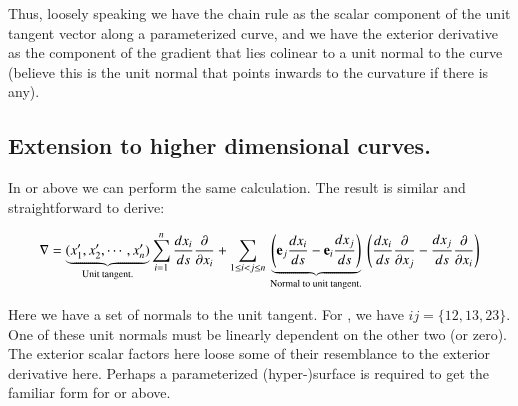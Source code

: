 \documentclass{article}      %
\newcommand{\grad}[0]{\nabla}
\begin{document}
Thus, loosely speaking we have the chain rule as the scalar component of the unit tangent vector along a parameterized curve,
and we have the exterior derivative as the component of the gradient that lies colinear to a unit normal to the curve (believe this
is the unit normal that points inwards to the curvature if there is any).

\subsection{ Extension to higher dimensional curves. }

In  or above we can perform the same calculation.  The result is similar and straightforward to derive:

\begin{equation}
\grad
=
\underbrace{
(x_1', x_2', \cdots, x_n')
 }_{\text{Unit tangent.} }
\sum_{i=1}^n \frac{dx_i}{ds}\frac{\partial}{\partial x_i}
+ \sum_{1 \le i < j \le n} 
\underbrace{
\left(
\Be_j \frac{dx_i}{ds}
-\Be_i \frac{dx_j}{ds}
\right)
}_{\text{ Normal to unit tangent. }}
\left(
\frac{dx_i}{ds}\frac{\partial}{\partial x_j}
-\frac{dx_j}{ds}\frac{\partial}{\partial x_i}
\right)
\end{equation}

Here we have a set of normals to the unit tangent.  For , we have $ij=\{12,13,23\}$.  One of these unit normals must
be linearly dependent on the other two (or zero).  The exterior scalar factors here loose some of their resemblance to the
exterior derivative here.  Perhaps a parameterized (hyper-)surface is required to get the familiar form for  or above.
\end{document}
